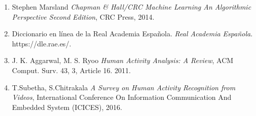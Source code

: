 \documentclass[a4paper,12pt,oneside,spanish]{book}
\begin{document}
\begin{enumerate}
	\item Stephen Marsland \textit{Chapman \& Hall/CRC Machine Learning An Algorithmic Perspective Second Edition}, CRC Press, 2014.
	
	\item Diccionario en línea de la Real Academia Española. \textit{Real Academia Española}. https://dle.rae.es/.
	
	\item J. K. Aggarwal, M. S. Ryoo \textit{Human Activity Analysis: A Review}, ACM Comput. Surv. 43, 3, Article 16. 2011.
	
	\item T.Subetha, S.Chitrakala \textit{A Survey on Human Activity Recognition from Videos}, International Conference On Information Communication And Embedded System (ICICES), 2016.
\end{enumerate}
\end{document}
